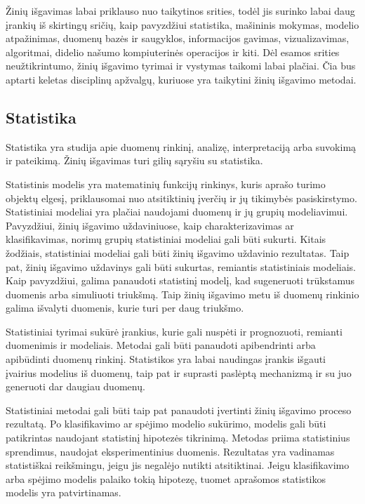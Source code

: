 Žinių išgavimas labai priklauso nuo taikytinos srities, todėl jis surinko labai daug įrankių iš skirtingų sričių, kaip pavyzdžiui statistika, mašininis mokymas, modelio atpažinimas, duomenų bazės ir saugyklos, informacijos gavimas, vizualizavimas, algoritmai, didelio našumo kompiuterinės operacijos ir kiti.
Dėl esamos srities neužtikrintumo, žinių išgavimo tyrimai ir vystymas taikomi labai plačiai.
Čia bus aptarti keletas disciplinų apžvalgų, kuriuose yra taikytini žinių išgavimo metodai.

\subsection{Statistika}

Statistika yra studija apie duomenų rinkinį, analizę, interpretaciją arba suvokimą ir pateikimą.
Žinių išgavimas turi gilių sąryšiu su statistika.

Statistinis modelis yra matematinių funkcijų rinkinys, kuris aprašo turimo objektų elgesį, priklausomai nuo atsitiktinių įverčių ir jų tikimybės pasiskirstymo.
Statistiniai modeliai yra plačiai naudojami duomenų ir jų grupių modeliavimui.
Pavyzdžiui, žinių išgavimo uždaviniuose, kaip charakterizavimas ar klasifikavimas, norimų grupių statistiniai modeliai gali būti sukurti.
Kitais žodžiais, statistiniai modeliai gali būti žinių išgavimo uždavinio rezultatas.
Taip pat, žinių išgavimo uždavinys gali būti sukurtas, remiantis statistiniais modeliais.
Kaip pavyzdžiui, galima panaudoti statistinį modelį, kad sugeneruoti trūkstamus duomenis arba simuliuoti triukšmą.
Taip žinių išgavimo metu iš duomenų rinkinio galima išvalyti duomenis, kurie turi per daug triukšmo.

Statistiniai tyrimai sukūrė įrankius, kurie gali nuspėti ir prognozuoti, remianti duomenimis ir modeliais.
Metodai gali būti panaudoti apibendrinti arba apibūdinti duomenų rinkinį.
Statistikos yra labai naudingas įrankis išgauti įvairius modelius iš duomenų, taip pat ir suprasti paslėptą mechanizmą ir su juo generuoti dar daugiau duomenų.

Statistiniai metodai gali būti taip pat panaudoti įvertinti žinių išgavimo proceso rezultatą.
Po klasifikavimo ar spėjimo modelio sukūrimo, modelis gali būti patikrintas naudojant statistinį hipotezės tikrinimą.
Metodas priima statistinius sprendimus, naudojat eksperimentinius duomenis.
Rezultatas yra vadinamas statistiškai reikšmingu, jeigu jis negalėjo nutikti atsitiktinai.
Jeigu klasifikavimo arba spėjimo modelis palaiko tokią hipotezę, tuomet aprašomos statistikos modelis yra patvirtinamas.

